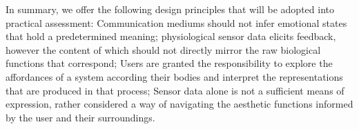 In summary, we offer the following design principles that will be adopted into practical assessment: Communication mediums should not infer emotional states that hold a predetermined meaning; physiological sensor data elicits feedback, however the content of which should not directly mirror the raw biological functions that correspond; Users are granted the responsibility to explore the affordances of a system according their bodies and interpret the representations that are produced in that process; Sensor data alone is not a sufficient means of expression, rather considered a way of navigating the aesthetic functions informed by the user and their surroundings.


